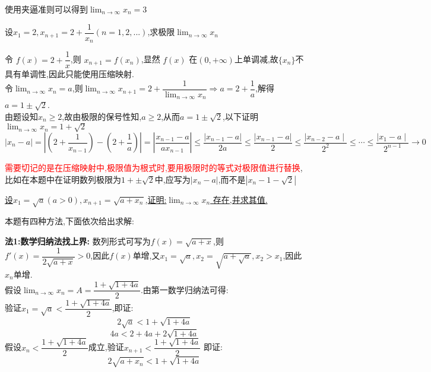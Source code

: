 \documentclass[8pt a4paper, oneside, UTF8]{ctexbook}
\begin{document}
\begin{sloppypar}
\begin{note}
\begin{solution}
$$            $$使用夹逼准则可以得到$\lim_{n\to \infty}x_n=3$
        \end{solution}
    \end{note}
    \begin{problem}
    设$x_1=2,x_{n+1}=2+\dfrac1{x_n}(n=1,2,...)$,求极限$\lim_{n\to\infty}x_n$
    \end{problem}
    \begin{solution}
        令 $f(x)=2+\dfrac1x$,则 $x_{n+1}=f(x_n)$,显然 $f(x)$ 在$(0,+\infty)$上单调减,故$\{x_n\}$不具有单调性,因此只能使用压缩映射.\\
        令$\lim_{n\to \infty}x_n=a$,则$\lim_{n \to \infty}x_{n+1}=2+\dfrac{1}{\lim_{n\to \infty}x_n} \Rightarrow a=2+\dfrac{1}{a}$,解得$a=1\pm \sqrt{2}$.\\
        由题设知$x_n\geq2$,故由极限的保号性知,$a\geq2$,从而$a=1 \pm \sqrt{2}$,以下证明$\lim_{n\to \infty}x_n=1+\sqrt{2}$\\
        $\mid x_n-a\mid=\left|\left(2+\dfrac{1}{x_{n-1}}\right)-\left(2+\dfrac{1}{a}\right)\right|=\left|\dfrac{x_{n-1}-a}{ax_{n-1}}\right|\leqslant\dfrac{\left|x_{n-1}-a\right|}{2a}\leqslant\dfrac{\left|x_{n-1}-a\right|}{2} \leqslant \dfrac{\mid x_{n-2}-a\mid}{2^2} \leqslant \cdots \leqslant \dfrac{\mid x_1-a\mid}{2^{n-1}}\to0$
    \end{solution}
    \begin{note}
        \textcolor{red}{需要切记的是在压缩映射中,极限值为根式时,要用极限时的等式对极限值进行替换},比如在本题中在证明数列极限为$1+\pm \sqrt{2}$中,应写为$|x_n -a|$,而不是$|x_n -1 -\sqrt{2}|$
    \end{note}
    \begin{problem}
    \uline{设$x_1=\sqrt{a}(a>0),x_{n+1}=\sqrt{a+x_n}$,证明:$\lim_{n\to\infty} x_n$ 存在,并求其值.}
    \end{problem}
    本题有四种方法,下面依次给出求解:
    \begin{solution}{\textbf{法1:数学归纳法找上界:}}
        数列形式可写为$f(x)=\sqrt{a+x}$,则$f'(x)=\dfrac{1}{2\sqrt{a+x}}>0$,因此$f(x)$单增,又$x_1=\sqrt{a},x_2=\sqrt{a+\sqrt{a}},x_2>x_1$,因此$x_n$单增.\\
        假设$\lim_{n\to \infty}x_n=A=\dfrac{1+\sqrt{1+4a}}{2}$.由第一数学归纳法可得:\\
        验证$x_1=\sqrt{a}<\dfrac{1+\sqrt{1+4a}}{2}$,即证:$$
            2\sqrt{a}<1+\sqrt{1+4a}
        $$
        $$
            4a<2+4a+2\sqrt{1+4a}
        $$
        假设$x_n<\dfrac{1+\sqrt{1+4a}}{2}$成立,验证$x_{n+1}<\dfrac{1+\sqrt{1+4a}}{2}$
        即证:$$
            2\sqrt{a+x_n}<1+\sqrt{1+4a}
$$
\end{solution}
\end{sloppypar}
\end{document}
